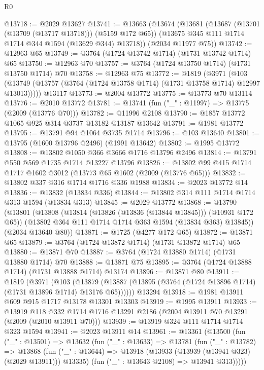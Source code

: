 \begin{lexlean}{R0}
\begin{coremodule}
@13718 := @2029 @13627
@13741 := @13663
    (@13674
      (@13681
        (@13687 (@13701 (@13709 (@13717 @13718))) (@5159 @172 @65))
        (@13675 @345 @111 @1714 @1714 @344 @1594 (@13629 @344) @13718))
      (@2034 @11977 @75))
@13742 := @12963 @65
@13749 := @3764 (@1724 @13742 @1714) (@1731 @13742 @1714) @65
@13750 := @12963 @70
@13757 := @3764 (@1724 @13750 @1714) (@1731 @13750 @1714) @70
@13758 := @12963 @75
@13772 := @1819
    (@3971 (@103 (@13749 (@13757 (@3764 (@1724 @13758 @1714) (@1731 @13758 @1714) @12997 @13013)))))
    @13117
@13773 := @2004 @13772
@13775 := @13773 @70 @13114
@13776 := @2010 @13772
@13781 := @13741 (fun ("_" : @11997) => @13775 (@2009 (@13776 @70)))
@13782 := @11996 @2108
@13790 := @1857 @13772 @1065 @925 @314 @3737 @13182 @13187 @13642
@13791 := @1981 @13772
@13795 := @13791 @94 @1064 @3735 @1714
@13796 := @103 @13640
@13801 := @13795 (@1600 @13796 @2496) (@1991 @13642)
@13802 := @1995 @13772
@13808 := @13802 @1050 @366 @3666 @1716 @13796 @2496
@13814 := @13791 @550 @569 @1735 @1714 @13227 @13796
@13826 := @13802 @99 @415 @1714 @1717 @1602 @3012 (@13773 @65 @1602 (@2009 (@13776 @65)))
@13832 := @13802 @337 @316 @1714 @1716 @336 @1988
@13834 := @2023 @13772 @14
@13836 := @13832 (@13834 @336)
@13844 := @13802 @314 @111 @1714 @1714 @313 @1594 (@13834 @313)
@13845 := @2029 @13772
@13868 := @13790
    (@13801
      (@13808
        (@13814 (@13826 (@13836 (@13844 @13845))) (@10931 @172 @65))
        (@13802 @364 @111 @1714 @1714 @363 @1594 (@13834 @363) @13845))
      (@2034 @13640 @80))
@13871 := @1725 (@4277 @172 @65)
@13872 := @13871 @65
@13879 := @3764 (@1724 @13872 @1714) (@1731 @13872 @1714) @65
@13880 := @13871 @70
@13887 := @3764 (@1724 @13880 @1714) (@1731 @13880 @1714) @70
@13888 := @13871 @75
@13895 := @3764 (@1724 @13888 @1714) (@1731 @13888 @1714) @13174
@13896 := @13871 @80
@13911 := @1819
    (@3971
      (@103
        (@13879 (@13887 (@13895 (@3764 (@1724 @13896 @1714) (@1731 @13896 @1714) @13176 @65))))))
    @13294
@13918 := @1981 @13911 @609 @915 @1717 @13178 @13301 @13303
@13919 := @1995 @13911
@13933 := @13919
    @118
    @332
    @1714
    @1716
    @13291
    @2186
    (@2004 @13911 @70 @13291 (@2009 (@2010 @13911 @70)))
@13939 := @13919 @324 @111 @1714 @1714 @323 @1594
@13941 := @2023 @13911 @14
@13961 := @13361
    (@13500
      (fun ("_" : @13501) =>
      @13632
        (fun ("_" : @13633) =>
        @13781
          (fun ("_" : @13782) =>
          @13868
            (fun ("_" : @13644) => @13918 (@13933 (@13939 (@13941 @323) (@2029 @13911))) @13335)
            (fun ("_" : @13643 @2108) => @13941 @313)))))

\end{coremodule}
\end{lexlean}
